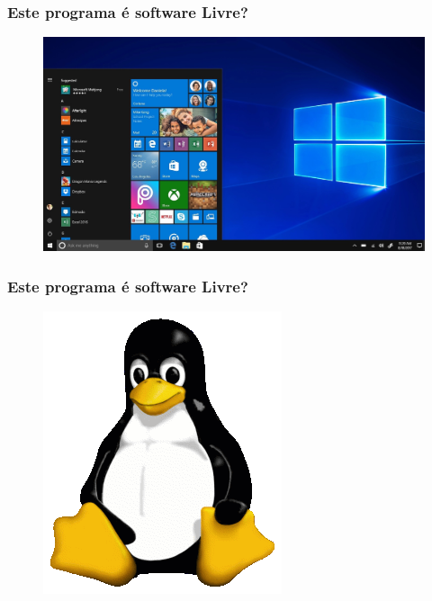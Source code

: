 \documentclass[xcolor=dvipsnames]{beamer}
\begin{document}
\begin{frame}
	\frametitle{Este programa é software Livre?}
	\begin{figure}
	\includegraphics[scale=0.21]{windows.jpg}\\
	\end{figure}	
\end{frame}

\begin{frame}
	\frametitle{Este programa é software Livre?}
	\begin{figure}
	\includegraphics[scale=0.45]{tux.png}\\
	\end{figure}	
\end{frame}
\end{document}
